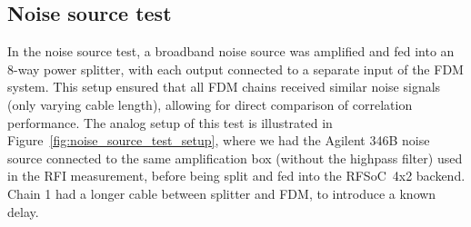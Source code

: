 \subsection{Noise source test}
\label{sec:noise_source_test}
In the noise source test, a broadband noise source was amplified and fed into an 8-way power splitter, with each output connected to a separate input of the FDM system. This setup ensured that all FDM chains received similar noise signals (only varying cable length), allowing for direct comparison of correlation performance. The analog setup of this test is illustrated in Figure~\ref{fig:noise_source_test_setup}, where we had the Agilent 346B noise source connected to the same amplification box (without the highpass filter) used in the RFI measurement, before being split and fed into the RFSoC~4x2 backend. Chain 1 had a longer cable between splitter and FDM, to introduce a known delay.

